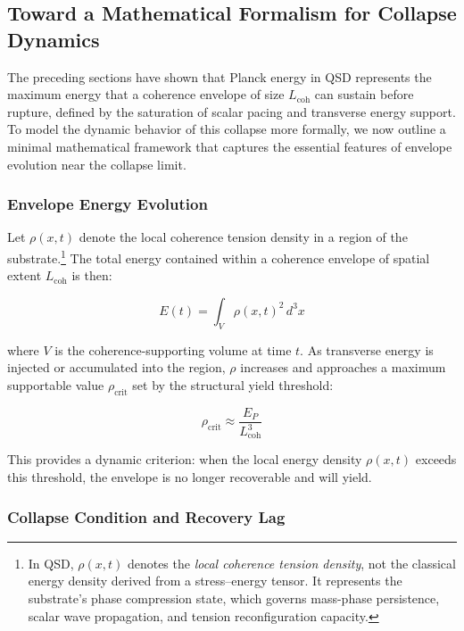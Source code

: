 \documentclass[entropy,article,submit,pdftex,moreauthors]{Definitions/mdpi}
\begin{document}
\subsection{Toward a Mathematical Formalism for Collapse Dynamics}

The preceding sections have shown that Planck energy in QSD represents the maximum energy that a coherence envelope of size $L_{\text{coh}}$ can sustain before rupture, defined by the saturation of scalar pacing and transverse energy support. To model the dynamic behavior of this collapse more formally, we now outline a minimal mathematical framework that captures the essential features of envelope evolution near the collapse limit.

\subsubsection{Envelope Energy Evolution}

Let \( \rho(x, t) \) denote the local coherence tension density in a region of the substrate.\footnote{In QSD, \( \rho(x,t) \) denotes the \textit{local coherence tension density}, not the classical energy density derived from a stress–energy tensor. It represents the substrate’s phase compression state, which governs mass-phase persistence, scalar wave propagation, and tension reconfiguration capacity.} The total energy contained within a coherence envelope of spatial extent $L_{\text{coh}}$ is then:


\begin{equation}
E(t) = \int_{V} \rho(x,t)^2 \, d^3x
\end{equation}

where $V$ is the coherence-supporting volume at time $t$. As transverse energy is injected or accumulated into the region, $\rho$ increases and approaches a maximum supportable value $\rho_{\text{crit}}$ set by the structural yield threshold:

\begin{equation}
\rho_{\text{crit}} \approx \frac{E_P}{L_{\text{coh}}^3}
\end{equation}

This provides a dynamic criterion: when the local energy density $\rho(x,t)$ exceeds this threshold, the envelope is no longer recoverable and will yield.

\subsubsection{Collapse Condition and Recovery Lag}
\end{document}
